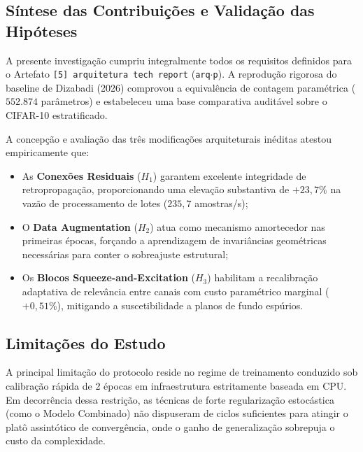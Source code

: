 \documentclass[runningheads]{llncs}
\begin{document}
\subsection{S\'{i}ntese das Contribui\c{c}\~{o}es e Valida\c{c}\~{a}o das Hip\'{o}teses}
A presente investiga\c{c}\~{a}o cumpriu integralmente todos os requisitos definidos para o Artefato \texttt{[5] arquitetura tech report} (\texttt{arq$\cdot$p}). A reprodu\c{c}\~{a}o rigorosa do baseline de Dizabadi (2026) comprovou a equival\^{e}ncia de contagem param\'{e}trica ($552.874$ par\^{a}metros) e estabeleceu uma base comparativa audit\'{a}vel sobre o CIFAR-10 estratificado.

A concep\c{c}\~{a}o e avalia\c{c}\~{a}o das tr\^{e}s modifica\c{c}\~{o}es arquiteturais in\'{e}ditas atestou empiricamente que:
\begin{itemize}
    \item As \textbf{Conex\~{o}es Residuais} ($H_1$) garantem excelente integridade de retropropaga\c{c}\~{a}o, proporcionando uma eleva\c{c}\~{a}o substantiva de $+23{,}7\%$ na vaz\~{a}o de processamento de lotes ($235{,}7$ amostras/s);
    \item O \textbf{Data Augmentation} ($H_2$) atua como mecanismo amortecedor nas primeiras \'{e}pocas, for\c{c}ando a aprendizagem de invari\^{a}ncias geom\'{e}tricas necess\'{a}rias para conter o sobreajuste estrutural;
    \item Os \textbf{Blocos Squeeze-and-Excitation} ($H_3$) habilitam a recalibra\c{c}\~{a}o adaptativa de relev\^{a}ncia entre canais com custo param\'{e}trico marginal ($+0{,}51\%$), mitigando a suscetibilidade a planos de fundo esp\'{u}rios.
\end{itemize}

\subsection{Limita\c{c}\~{o}es do Estudo}
A principal limita\c{c}\~{a}o do protocolo reside no regime de treinamento conduzido sob calibra\c{c}\~{a}o r\'{a}pida de 2 \'{e}pocas em infraestrutura estritamente baseada em CPU. Em decorr\^{e}ncia dessa restri\c{c}\~{a}o, as t\'{e}cnicas de forte regulariza\c{c}\~{a}o estoc\'{a}stica (como o Modelo Combinado) n\~{a}o dispuseram de ciclos suficientes para atingir o plat\^{o} assint\'{o}tico de converg\^{e}ncia, onde o ganho de generaliza\c{c}\~{a}o sobrepuja o custo da complexidade.
\end{document}
